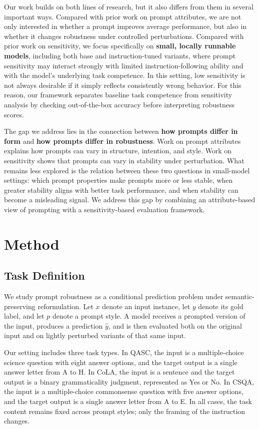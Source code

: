 \documentclass[11pt]{article}
\begin{document}
Our work builds on both lines of research, but it also differs from them in several important ways. Compared with prior work on prompt attributes, we are not only interested in whether a prompt improves average performance, but also in whether it changes robustness under controlled perturbations. Compared with prior work on sensitivity, we focus specifically on \textbf{small, locally runnable models}, including both base and instruction-tuned variants, where prompt sensitivity may interact strongly with limited instruction-following ability and with the model's underlying task competence. In this setting, low sensitivity is not always desirable if it simply reflects consistently wrong behavior. For this reason, our framework separates baseline task competence from sensitivity analysis by checking out-of-the-box accuracy before interpreting robustness scores.

The gap we address lies in the connection between \textbf{how prompts differ in form} and \textbf{how prompts differ in robustness}. Work on prompt attributes explains how prompts can vary in structure, intention, and style. Work on sensitivity shows that prompts can vary in stability under perturbation. What remains less explored is the relation between these two questions in small-model settings: which prompt properties make prompts more or less stable, when greater stability aligns with better task performance, and when stability can become a misleading signal. We address this gap by combining an attribute-based view of prompting with a sensitivity-based evaluation framework.

\section{Method}

\subsection{Task Definition}

We study prompt robustness as a conditional prediction problem under semantic-preserving reformulation. Let $x$ denote an input instance, let $y$ denote its gold label, and let $p$ denote a prompt style. A model receives a prompted version of the input, produces a prediction $\hat{y}$, and is then evaluated both on the original input and on lightly perturbed variants of that same input.

Our setting includes three task types. In QASC, the input is a multiple-choice science question with eight answer options, and the target output is a single answer letter from A to H. In CoLA, the input is a sentence and the target output is a binary grammaticality judgment, represented as Yes or No. In CSQA, the input is a multiple-choice commonsense question with five answer options, and the target output is a single answer letter from A to E. In all cases, the task content remains fixed across prompt styles; only the framing of the instruction changes.
\end{document}
